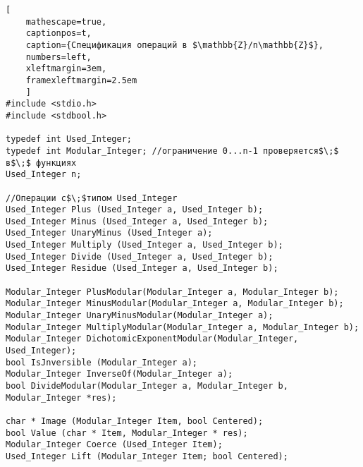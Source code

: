 \documentclass{../../template/mai_book}
\begin{document}
    \newpage
    \begin{lstlisting}[
    mathescape=true,
    captionpos=t,
    caption={Спецификация операций в $\mathbb{Z}/n\mathbb{Z}$},
    numbers=left,
    xleftmargin=3em,
    framexleftmargin=2.5em
    ]
#include <stdio.h>
#include <stdbool.h>

typedef int Used_Integer;
typedef int Modular_Integer; //ограничение 0...n-1 проверяется$\;$ в$\;$ функциях
Used_Integer n;

//Операции с$\;$типом Used_Integer
Used_Integer Plus (Used_Integer a, Used_Integer b);
Used_Integer Minus (Used_Integer a, Used_Integer b);
Used_Integer UnaryMinus (Used_Integer a);
Used_Integer Multiply (Used_Integer a, Used_Integer b);
Used_Integer Divide (Used_Integer a, Used_Integer b);
Used_Integer Residue (Used_Integer a, Used_Integer b);

Modular_Integer PlusModular(Modular_Integer a, Modular_Integer b);
Modular_Integer MinusModular(Modular_Integer a, Modular_Integer b);
Modular_Integer UnaryMinusModular(Modular_Integer a);
Modular_Integer MultiplyModular(Modular_Integer a, Modular_Integer b);
Modular_Integer DichotomicExponentModular(Modular_Integer, Used_Integer);
bool IsJnversible (Modular_Integer a);
Modular_Integer InverseOf(Modular_Integer a);
bool DivideModular(Modular_Integer a, Modular_Integer b, Modular_Integer *res);

char * Image (Modular_Integer Item, bool Centered);
bool Value (char * Item, Modular_Integer * res);
Modular_Integer Coerce (Used_Integer Item);
Used_Integer Lift (Modular_Integer Item; bool Centered);

\end{lstlisting}
\end{document}
